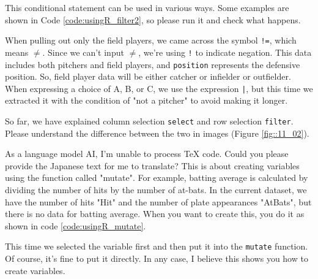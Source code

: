 \documentclass{ltjsbook}
\begin{document}
This conditional statement can be used in various ways. Some examples are shown in Code \ref{code:usingR_filter2}, so please run it and check what happens.

When pulling out only the field players, we came across the symbol \verb|!=|, which means $\neq$. Since we can't input $\neq$, we're using \verb|!| to indicate negation. This data includes both pitchers and field players, and \texttt{position} represents the defensive position. So, field player data will be either catcher or infielder or outfielder. When expressing a choice of A, B, or C, we use the expression \verb"|", but this time we extracted it with the condition of "not a pitcher" to avoid making it longer.

So far, we have explained column selection \texttt {select} and row selection \texttt {filter}. Please understand the difference between the two in images (Figure \ref{fig::11_02}).


As a language model AI, I'm unable to process TeX code. Could you please provide the Japanese text for me to translate?
This is about creating variables using the function called "mutate". For example, batting average is calculated by dividing the number of hits by the number of at-bats.
In the current dataset, we have the number of hits "Hit" and the number of plate appearances "AtBats", but there is no data for batting average. When you want to create this, you do it as shown in code \ref{code:usingR_mutate}.

This time we selected the variable first and then put it into the \verb|mutate| function. Of course, it's fine to put it directly.
In any case, I believe this shows you how to create variables.
\end{document}
